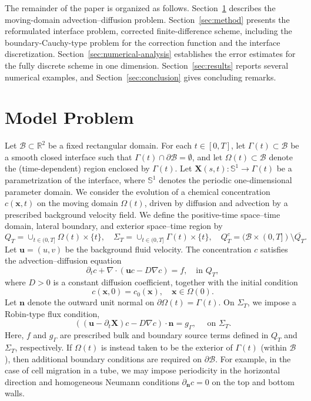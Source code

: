 \documentclass[11pt,reqno]{amsart}
\theoremstyle{plain}
\theoremstyle{definition}
\numberwithin{equation}{section}
\newcommand{\paren}[1]{\left(#1\right)}
\newcommand{\p}{\partial}
\newcommand{\grad}[1]{\nabla #1}
\newcommand{\mc}[1]{\mathcal{#1}}
\newcommand{\bm}[1]{\boldsymbol{#1}}
\newcommand{\R}{\mathbb{R}}
\begin{document}
The remainder of the paper is organized as follows. Section~\ref{sec:model} describes the moving-domain advection--diffusion problem. Section~\ref{sec:method} presents the reformulated interface problem, corrected finite-difference scheme, including the boundary-Cauchy-type problem for the correction function and the interface discretization. Section~\ref{sec:numerical-analysis} establishes the error estimates for the fully discrete scheme in one dimension. Section~\ref{sec:results} reports several numerical examples, and Section~\ref{sec:conclusion} gives concluding remarks.

\section{Model Problem}\label{sec:model}
Let $\mc B\subset \R^2$ be a fixed rectangular domain. For each $t\in[0,T]$, let $\Gamma(t)\subset\mc B$ be a smooth closed interface such that $\Gamma(t)\cap\p\mc B=\emptyset$, and let $\Omega(t)\subset\mc B$ denote the (time-dependent) region enclosed by $\Gamma(t)$. Let $\bm X(s,t):\mathbb S^1\to \Gamma(t)$ be a parametrization of the interface, where $\mathbb S^1$ denotes the periodic one-dimensional parameter domain. We consider the evolution of a chemical concentration $c(\bm x,t)$ on the moving domain $\Omega(t)$, driven by diffusion and advection by a prescribed background velocity field. We define the positive-time space--time domain, lateral boundary, and exterior space--time region by
\begin{equation}
  Q_T = \cup_{t\in(0,T]}\Omega(t)\times\{t\},\quad \Sigma_T = \cup_{t\in(0,T]}\Gamma(t)\times\{t\},\quad Q_T^c = (\mc B\times(0,T])\setminus \overline{Q_T}.
\end{equation}
Let $\bm u=(u,v)$ be the background fluid velocity. The concentration $c$ satisfies the advection--diffusion equation
\begin{equation}
  \p_t c + \grad\cdot\paren{\bm u c - D\grad c} = f, \quad \text{in } Q_T,
\end{equation}
where $D>0$ is a constant diffusion coefficient, together with the initial condition
\begin{equation}
  c(\bm x, 0) = c_0(\bm x), \quad \bm x \in \Omega(0).
\end{equation}
Let $\bm n$ denote the outward unit normal on $\p\Omega(t)=\Gamma(t)$. On $\Sigma_T$, we impose a Robin-type flux condition,
\begin{equation}
  \paren{(\bm u - \p_t\bm X) c - D\grad c} \cdot \bm n = g_\Gamma, \quad\text{ on }\Sigma_T.
\end{equation}
Here, $f$ and $g_\Gamma$ are prescribed bulk and boundary source terms defined in $Q_T$ and $\Sigma_T$, respectively.
If $\Omega(t)$ is instead taken to be the exterior of $\Gamma(t)$ (within $\mc B$), then additional boundary conditions are required on $\p\mc B$. For example, in the case of cell migration in a tube, we may impose periodicity in the horizontal direction and homogeneous Neumann conditions $\p_{\bm n}c=0$ on the top and bottom walls.
\end{document}
